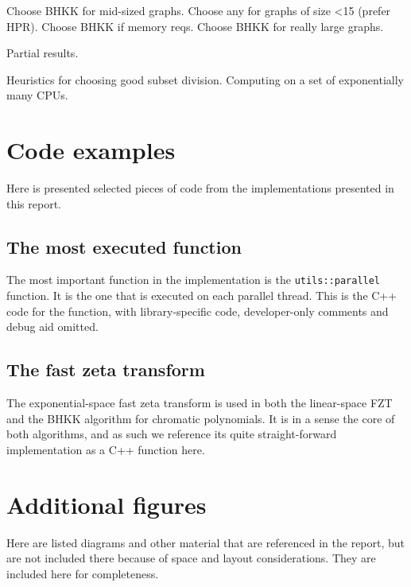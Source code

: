 \documentclass{cslthse-msc}
\newcommand{\code}{\texttt}
\begin{document}
Choose BHKK for mid-sized graphs.
Choose any for graphs of size <15 (prefer HPR).
Choose BHKK if memory reqs.
Choose BHKK for really large graphs.

Partial results.

Heuristics for choosing good subset division.
Computing on a set of exponentially many CPUs.




\begin{appendices}
 \chapter{Code examples}
 Here is presented selected pieces of code from the implementations presented in this report.
 
 \section{The most executed function}\label{fztlin_code}
 The most important function in the implementation is the \code{utils::parallel} function. It is the one that is executed on each parallel thread. This is the C++ code for the function, with library-specific code, developer-only comments and debug aid omitted.
 
 \section{The fast zeta transform}\label{fzt_code}
 The exponential-space fast zeta transform is used in both the linear-space FZT and the BHKK algorithm for chromatic polynomials. It is in a sense the core of both algorithms, and as such we reference its quite straight-forward implementation as a C++ function here.
 
 
 \chapter{Additional figures}
 Here are listed diagrams and other material that are referenced in the report, but are not included there because of space and layout considerations. They are included here for completeness.
 

\end{appendices}
\end{document}
